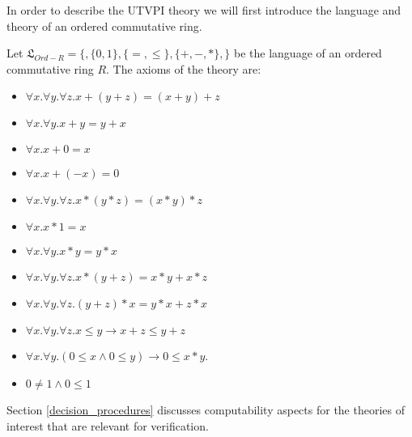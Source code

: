 In order to describe the UTVPI theory we will first introduce the language and theory of an ordered commutative ring.

\begin{definition}
  Let $\mathfrak{L}_{Ord-R} = \{, \{0, 1 \}, \{ = , \leq \}, \{+, -, * \}, \}$ be the 
  language of an ordered commutative ring $R$. The axioms of the theory are:
  \begin{itemize}
    \item $\forall x . \forall y . \forall z . x + (y + z) = (x + y) + z$
    \item $\forall x . \forall y .  x + y = y + x$
    \item $\forall x . x + 0 = x$
    \item $\forall x . x + (- x) = 0$
    \item $\forall x . \forall y . \forall z. x * (y * z) = (x * y) * z$
    \item $\forall x . x * 1 = x$
    \item $\forall x . \forall y .  x * y = y * x$
    \item $\forall x . \forall y . \forall z . x * (y + z) = x * y + x * z$
    \item $\forall x . \forall y . \forall z . (y + z) * x = y*x + z * x$
    \item $\forall x . \forall y . \forall z . x \leq y \rightarrow x + z \leq y + z$
    \item $\forall x . \forall y . (0 \leq x \land 0 \leq y) \rightarrow 0 \leq x * y$.
    \item $0 \neq 1 \land 0 \leq 1$ 
  \end{itemize}
\end{definition}

Section \ref{decision_procedures} discusses computability 
aspects for the theories of interest that are relevant 
for verification.

